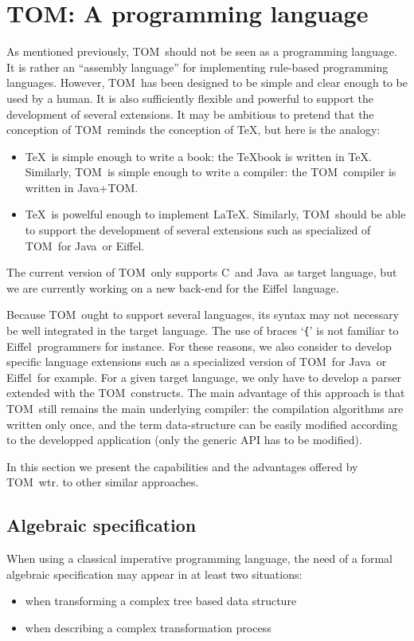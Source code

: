 \documentclass[a4paper]{article}
\newcommand{\TOM}{\textsf{TOM}}
\newcommand{\C}{\textsf{C}}
\newcommand{\Java}{\textsf{Java}}
\newcommand{\Eiffel}{\textsf{Eiffel}}
\begin{document}
\newpage
\section{\TOM: A programming language}

As mentioned previously, \TOM\ should not be seen as a programming
language. It is rather an ``assembly language'' for implementing
rule-based programming languages. 
However, \TOM\ has been designed to be simple and clear enough
to be used by a human. It is also sufficiently flexible and powerful
to support the development of several extensions.
It may be ambitious to pretend that the conception of \TOM\ reminds
the conception of \TeX, but here is the analogy:
\begin{itemize}
\item \TeX\ is simple enough to write a book: the {\TeX}book is
  written in \TeX.
  Similarly, \TOM\ is simple enough to write a compiler: the \TOM\
  compiler is written in \Java+\TOM.
\item \TeX\ is powelful enough to implement \LaTeX. 
  Similarly, \TOM\ should be able to support the development of
  several extensions such as specialized of \TOM\ for \Java\ or \Eiffel.
\end{itemize}

The current version of \TOM\ only supports \C\ and \Java\ as target
language, but we are currently working on a new back-end for the
\Eiffel\ language.

Because \TOM\ ought to support several languages, its syntax may
not necessary be well integrated in the target language. The use of
braces `\texttt{\{}' is not familiar to \Eiffel\ programmers for instance.
For these reasons, we also consider to develop specific language
extensions such as a specialized version of \TOM\ for \Java\ or \Eiffel\
for example. 
For a given target language, we only have to develop a parser extended
with the \TOM\ constructs.
The main advantage of this approach is that \TOM\ still remains the
main underlying compiler: the compilation algorithms are written only
once, and the term data-structure can be easily modified according to
the developped application (only the generic API has to be modified).

In this section we present the capabilities and the advantages
offered by \TOM\ wtr. to other similar approaches.

\subsection{Algebraic specification}
When using a classical imperative programming language, the need of
a formal algebraic specification may appear in at least two
situations: 
\begin{itemize}
\item when transforming a complex tree based data structure
\item when describing a complex transformation process
\end{itemize}
\end{document}
